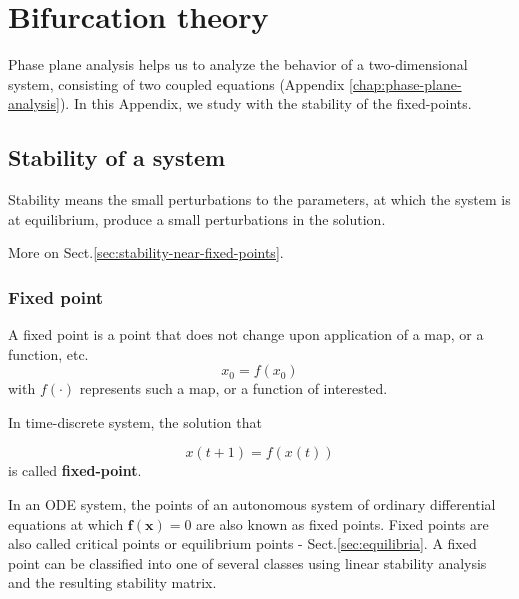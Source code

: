
\chapter{Bifurcation theory}
\label{chap:bifurcation-theory}

Phase plane analysis helps us to analyze the behavior of a two-dimensional
system, consisting of two coupled equations (Appendix
\ref{chap:phase-plane-analysis}). In this Appendix, we study with the stability
of the fixed-points. 

\citep{rinzel1983}

\section{Stability of a system}
\label{sec:stability}

Stability means the small perturbations to the parameters, at which the system
is at equilibrium, produce a small perturbations in the solution.

More on Sect.\ref{sec:stability-near-fixed-points}.

\subsection{Fixed point}
\label{sec:fixed-point}

A fixed point is a point that does not change upon application of a map, or a function, etc. 
\begin{equation}
x_0 = f(x_0)
\end{equation}
with $f(\cdot)$ represents such a map, or a function of interested.

In time-discrete system, the solution that

\begin{equation}
  \label{eq:637}
  x(t+1) = f(x(t))
\end{equation}
is called {\bf fixed-point}.



In an ODE system, the points of an autonomous system of ordinary differential
equations at which $\mathbf{f(x)} = 0$ are also known as fixed points. Fixed
points are also called critical points or equilibrium points -
Sect.\ref{sec:equilibria}. A fixed point can be classified into one of several
classes using linear stability analysis and the resulting stability matrix.


